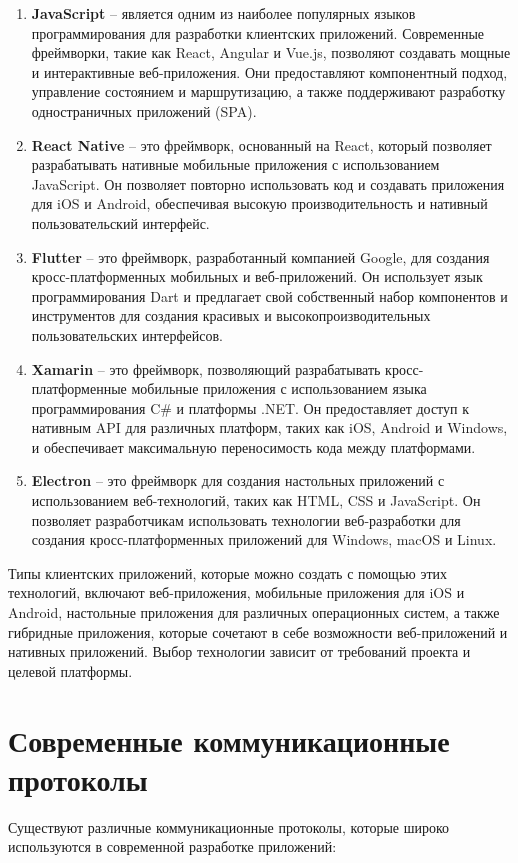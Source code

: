 \begin{enumerate}
    \item \textbf{JavaScript} -- является одним из наиболее популярных языков программирования для разработки клиентских приложений. 
    Современные фреймворки, такие как React, Angular и Vue.js, 
    позволяют создавать мощные и интерактивные веб-приложения. 
    Они предоставляют компонентный подход, управление состоянием и маршрутизацию, 
    а также поддерживают разработку одностраничных приложений (SPA).
    \item \textbf{React Native} -- это фреймворк, основанный на React, 
    который позволяет разрабатывать нативные мобильные приложения 
    с использованием JavaScript. Он позволяет повторно использовать код и создавать приложения для iOS и Android, 
    обеспечивая высокую производительность и нативный пользовательский интерфейс.
    \item \textbf{Flutter} -- это фреймворк, разработанный компанией Google, для создания кросс-платформенных мобильных и веб-приложений. 
    Он использует язык программирования Dart и предлагает свой собственный набор компонентов 
    и инструментов для создания красивых и высокопроизводительных пользовательских интерфейсов.
    \item \textbf{Xamarin} -- это фреймворк, позволяющий разрабатывать кросс-платформенные мобильные приложения 
    с использованием языка программирования C\# и платформы .NET. 
    Он предоставляет доступ к нативным API для различных платформ, таких как iOS, Android и Windows, 
    и обеспечивает максимальную переносимость кода между платформами.
    \item \textbf{Electron} -- это фреймворк для создания настольных приложений с использованием веб-технологий, таких как HTML, 
    CSS и JavaScript. Он позволяет разработчикам использовать технологии веб-разработки 
    для создания кросс-платформенных приложений для Windows, macOS и Linux.
\end{enumerate}

Типы клиентских приложений, которые можно создать с помощью этих технологий, 
включают веб-приложения, мобильные приложения для iOS и Android, настольные приложения для различных операционных систем, 
а также гибридные приложения, которые сочетают в себе возможности веб-приложений и 
нативных приложений. Выбор технологии зависит от требований проекта и
целевой платформы.



\section{Современные коммуникационные протоколы}
Существуют различные коммуникационные протоколы, которые широко используются в современной разработке приложений:

